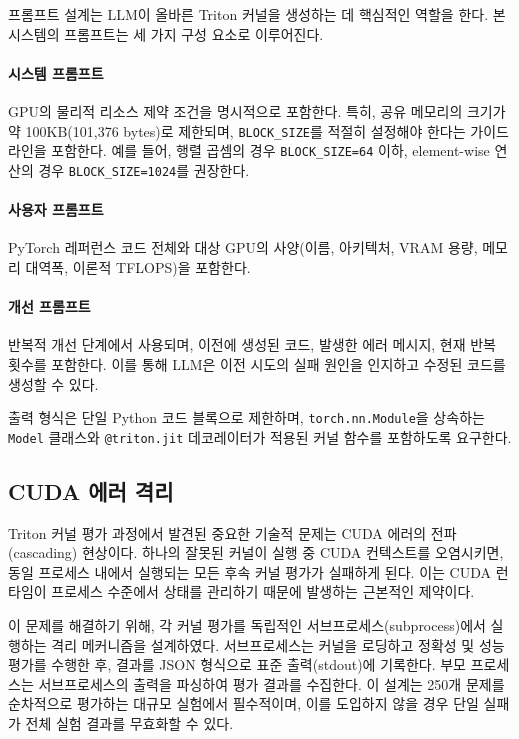 \documentclass[sigplan,screen,review,anonymous]{acmart}
\begin{document}
프롬프트 설계는 LLM이 올바른 Triton 커널을 생성하는 데 핵심적인 역할을 한다. 본 시스템의 프롬프트는 세 가지 구성 요소로 이루어진다.

\paragraph{시스템 프롬프트} GPU의 물리적 리소스 제약 조건을 명시적으로 포함한다. 특히, 공유 메모리의 크기가 약 100KB(101,376 bytes)로 제한되며, \texttt{BLOCK\_SIZE}를 적절히 설정해야 한다는 가이드라인을 포함한다. 예를 들어, 행렬 곱셈의 경우 \texttt{BLOCK\_SIZE=64} 이하, element-wise 연산의 경우 \texttt{BLOCK\_SIZE=1024}를 권장한다.

\paragraph{사용자 프롬프트} PyTorch 레퍼런스 코드 전체와 대상 GPU의 사양(이름, 아키텍처, VRAM 용량, 메모리 대역폭, 이론적 TFLOPS)을 포함한다.

\paragraph{개선 프롬프트} 반복적 개선 단계에서 사용되며, 이전에 생성된 코드, 발생한 에러 메시지, 현재 반복 횟수를 포함한다. 이를 통해 LLM은 이전 시도의 실패 원인을 인지하고 수정된 코드를 생성할 수 있다.

출력 형식은 단일 Python 코드 블록으로 제한하며, \texttt{torch.nn.Module}을 상속하는 \texttt{Model} 클래스와 \texttt{@triton.jit} 데코레이터가 적용된 커널 함수를 포함하도록 요구한다.

\subsection{CUDA 에러 격리}

Triton 커널 평가 과정에서 발견된 중요한 기술적 문제는 CUDA 에러의 전파(cascading) 현상이다. 하나의 잘못된 커널이 실행 중 CUDA 컨텍스트를 오염시키면, 동일 프로세스 내에서 실행되는 모든 후속 커널 평가가 실패하게 된다. 이는 CUDA 런타임이 프로세스 수준에서 상태를 관리하기 때문에 발생하는 근본적인 제약이다.

이 문제를 해결하기 위해, 각 커널 평가를 독립적인 서브프로세스(subprocess)에서 실행하는 격리 메커니즘을 설계하였다. 서브프로세스는 커널을 로딩하고 정확성 및 성능 평가를 수행한 후, 결과를 JSON 형식으로 표준 출력(stdout)에 기록한다. 부모 프로세스는 서브프로세스의 출력을 파싱하여 평가 결과를 수집한다. 이 설계는 250개 문제를 순차적으로 평가하는 대규모 실험에서 필수적이며, 이를 도입하지 않을 경우 단일 실패가 전체 실험 결과를 무효화할 수 있다.
\end{document}
